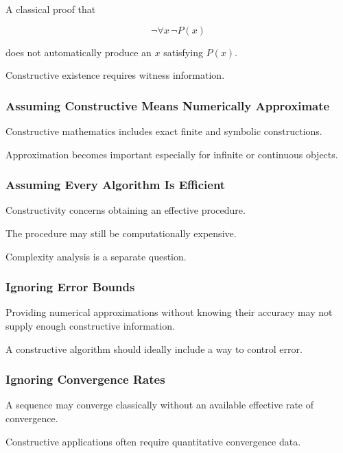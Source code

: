 A classical proof that

\[
\neg
\forall x\,\neg P(x)
\]

does not automatically produce an \(x\) satisfying \(P(x)\).

Constructive existence requires witness information.

\subsubsection{Assuming Constructive Means Numerically Approximate}

Constructive mathematics includes exact finite and symbolic constructions.

Approximation becomes important especially for infinite or continuous
objects.

\subsubsection{Assuming Every Algorithm Is Efficient}

Constructivity concerns obtaining an effective procedure.

The procedure may still be computationally expensive.

Complexity analysis is a separate question.

\subsubsection{Ignoring Error Bounds}

Providing numerical approximations without knowing their accuracy may not
supply enough constructive information.

A constructive algorithm should ideally include a way to control error.

\subsubsection{Ignoring Convergence Rates}

A sequence may converge classically without an available effective rate of
convergence.

Constructive applications often require quantitative convergence data.

